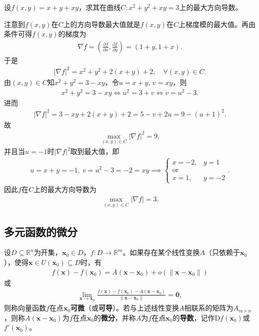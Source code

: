 \documentclass[../../main.tex]{subfiles}%
\begin{document}
\begin{example}
设$f(x,y) = x + y + xy$，求其在曲线$C: x^2 + y^2 + xy = 3$上的最大方向导数。
\end{example}
\begin{solution}

注意到$f(x,y)$在$C$上的方向导数最大值就是$f(x,y)$在$C$上梯度模的最大值。再由条件可得$f(x,y)$的梯度为
\begin{align*}
\nabla f = \left( \frac{\partial f}{\partial x}, \frac{\partial f}{\partial y} \right) = (1+y, 1+x).
\end{align*}
于是
\begin{align*}
|\nabla f|^2 = x^2 + y^2 + 2(x+y) + 2, \quad \forall (x,y) \in C.
\end{align*}
由$(x,y) \in C$知$x^2 + y^2 = 3 - xy$，令$u = x + y$, $v = xy$，则
\begin{align*}
x^2 + y^2 = 3 - xy \iff u^2 = 3 + v \iff v = u^2 - 3.
\end{align*}
进而
\begin{align*}
|\nabla f|^2 = 3 - xy + 2(x+y) + 2 = 5 - v + 2u = 9 - (u+1)^2.
\end{align*}
故
\begin{align*}
\max\limits_{(x,y) \in C} |\nabla f|^2 = 9,
\end{align*}
并且当$u = -1$时$|\nabla f|^2$取到最大值，即
\begin{align*}
u = x + y = -1,\ v = u^2 - 3 = -2 = xy \implies
\begin{cases}
x = -2, & y = 1 \\
\text{or} \\
x = 1, & y = -2
\end{cases}.
\end{align*}
因此$f$在$C$上的最大方向导数为
\begin{align*}
\max\limits_{(x,y) \in C} |\nabla f| = 3.
\end{align*}

\end{solution}


\subsection{多元函数的微分}

\begin{definition}
设$D \subseteq \mathbb{R}^n$为开集，$\bm{x}_0 \in D$，$f: D \to \mathbb{R}^m$。如果存在某个线性变换$A$（只依赖于$\bm{x}_0$），使得$\bm{x} \in U(\bm{x}_0) \subseteq D$时，有
\begin{align*}
f(\bm{x}) - f(\bm{x}_0) = A(\bm{x} - \bm{x}_0) + o\left( \|\bm{x} - \bm{x}_0\| \right)
\end{align*}
或
\begin{align*}
\lim\limits_{\bm{x} \to \bm{x}_0} \frac{f(\bm{x}) - f(\bm{x}_0) - A(\bm{x} - \bm{x}_0)}{\|\bm{x} - \bm{x}_0\|} = \bm{0},
\end{align*}
则称向量函数$f$在点$\bm{x}_0$\textbf{可微}（或\textbf{可导}）。若与上述线性变换$A$相联系的矩阵为$A_{m \times n}$，则称$A(\bm{x} - \bm{x}_0)$为$f$在点$\bm{x}_0$的\textbf{微分}，并称$A$为$f$在点$\bm{x}_0$的\textbf{导数}，记作$\mathrm{D}f(\bm{x}_0)$或$f'(\bm{x}_0)$。
\end{definition}
\end{document}

